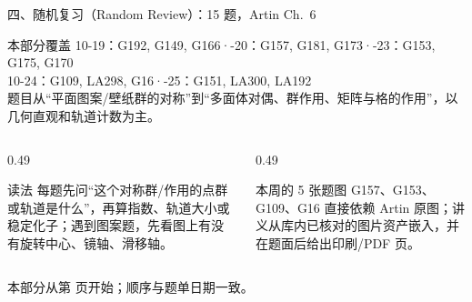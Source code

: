 \documentclass[aspectratio=169,10pt,fontset=none]{ctexbeamer}
\begin{document}
\begin{frame}[t]{四、随机复习（Random Review）：15 题，Artin Ch.~6}
  \label{sec:random}
  \begin{block}{\footnotesize 本部分覆盖}
    \scriptsize
    10-19：G192, G149, G166\quad·-20：G157, G181, G173\quad·-23：G153, G175, G170\\
    10-24：G109, LA298, G16\quad·-25：G151, LA300, LA192\\[2pt]
    题目从“平面图案/壁纸群的对称”到“多面体对偶、群作用、矩阵与格的作用”，以几何直观和轨道计数为主。
  \end{block}
  \begin{columns}[T,onlytextwidth]
    \begin{column}{0.49\textwidth}
      \begin{exampleblock}{\footnotesize 读法}
        \scriptsize
        每题先问“这个对称群/作用的点群或轨道是什么”，再算指数、轨道大小或稳定化子；遇到图案题，先看图上有没有旋转中心、镜轴、滑移轴。
      \end{exampleblock}
    \end{column}
    \begin{column}{0.49\textwidth}
      \begin{block}{\footnotesize 本周的 5 张题图}
        \scriptsize
        G157、G153、G109、G16 直接依赖 Artin 原图；讲义从库内已核对的图片资产嵌入，并在题面后给出印刷/PDF 页。
      \end{block}
    \end{column}
  \end{columns}
  \vspace{0.2em}
  {\scriptsize\color{ink!70} 本部分从第 \pageref{ex:G192} 页开始；顺序与题单日期一致。}
\end{frame}
\end{document}
